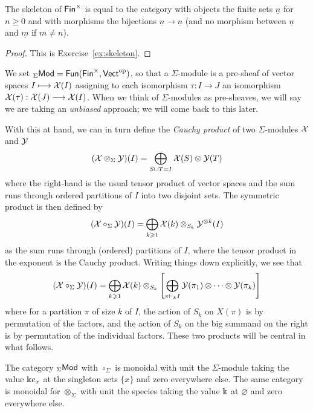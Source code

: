 \begin{lemma} The skeleton of $\mathsf{Fin}^\times$ is
equal to the category with objects the finite sets
$\underline{n}$ for $n\geqslant 0$ and with morphisms the
bijections $\underline{n}\longrightarrow \underline{n}$ (and no morphism
between $\underline{n}$ and $\underline{m}$ if $m\neq n$).
\end{lemma}

\begin{proof}
This is Exercise~\ref{ex:skeleton}.
\end{proof}

We set ${}_\Sigma\mathsf{Mod}  = 
\mathsf{Fun}(\mathsf{Fin}^\times,\mathsf{Vect}^{\mathrm{op}})$,
so that a $\Sigma$-module is a pre-sheaf of vector
spaces $I\longmapsto \mathcal{X}(I)$ assigning to each
isomorphism $\tau : I\longrightarrow J$ an isomorphism
$\mathcal{X}(\tau): \mathcal{X}(J)\longrightarrow \mathcal{X}(I)$. When we
think of $\Sigma$-modules as pre-sheaves, we will say we 
are taking an \emph{unbiased} approach; 
we will come back to this later.

With this at hand, 
we can in turn define the \emph{Cauchy product}
of two $\Sigma$-modules $\mathcal{X}$ and $\mathcal{Y}$
\[ (\mathcal{X}\otimes_\Sigma \mathcal{Y})(I) = 
 	\bigoplus_{S\sqcup T= I}
 		 \mathcal{X}(S)\otimes \mathcal{Y}(T)\] 
where the right-hand is the usual tensor product of
vector spaces
and the sum runs through ordered 
partitions of $I$ into
two disjoint sets. The symmetric product is then
defined by 
\[ (\mathcal{X}\circ_\Sigma \mathcal{Y})(I) 
 	= \bigoplus_{\substack{k\geqslant 1 }} \mathcal{X}(k) 
 		\otimes_{S_k} \mathcal{Y}^{\otimes k}(I)\] 
as the sum runs through (ordered) partitions of $I$, where the tensor product in the exponent is
the Cauchy product. Writing things down 
explicitly, we see that 
\[ (\mathcal{X}\circ_\Sigma \mathcal{Y})(I) 
 	= \bigoplus_{\substack{k\geqslant 1}}\mathcal{X}(k) 
 		\otimes_{S_k}
 		\left[
 		\bigoplus_{\pi\vdash_k I}\mathcal{Y}(\pi_1)\otimes\cdots\otimes
 			\mathcal{Y}(\pi_k) \right]\]
where for a partition $\pi$ of size $k$ of $I$,
the action of $S_k$ on $X(\pi)$ is by permutation
of the factors, and the action of $S_k$
on the big summand on the right is by permutation
of the individual factors. 
These two products will be central in what follows.

\begin{lemma}
The category ${}_\Sigma\mathsf{Mod}$ with $\circ_\Sigma$ is
monoidal with unit the $\Sigma$-module taking the value $\Bbbk e_x$ at 
the singleton sets $\{x\}$ and zero everywhere else. The same
category is monoidal for $\otimes_\Sigma$ with unit
the species taking the value $\Bbbk$ at $\varnothing$
and zero everywhere else.
\end{lemma}

